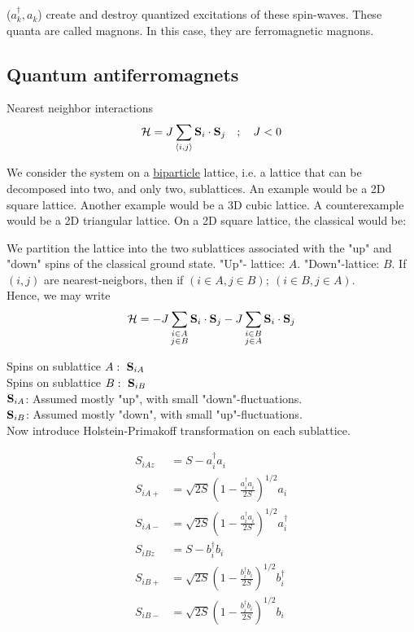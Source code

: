 
($a_k^\dagger, a_k^{}$) create and destroy quantized excitations of these spin-waves. These quanta are called magnons. In this case, they are ferromagnetic magnons.

\subsection{Quantum antiferromagnets}

Nearest neighbor interactions
\begin{equation}
	\mathcal{H} = J \sum_{\langle i, j \rangle}\vb{S}_i\cdot\vb{S}_j \quad ; \quad J < 0
\end{equation}

We consider the system on a \uline{biparticle} lattice, i.e. a lattice that can be decomposed into two, and only two, sublattices. An example would be a 2D square lattice. Another example would be a 3D cubic lattice. A counterexample would be a 2D triangular lattice. On a 2D square lattice, the classical would be:\\


We partition the lattice into the two sublattices associated with the "up" and "down" spins of the classical ground state. "Up"- lattice: $A$. "Down"-lattice: $B$. If $(i, j)$ are nearest-neigbors, then if $(i \in A, j \in B); \ (i \in B, j \in A)$. \\
Hence, we may write
\begin{equation}
	\mathcal{H} = - J \sum_{\substack{i \in A \\ j \in B}} \vb{S}_i \cdot \vb{S}_j - J \sum_{\substack{i \in B \\ j \in A}} \vb{S}_i \cdot \vb{S}_j
\end{equation}

Spins on sublattice $A: \ \vb{S}_{iA}$ \\
Spins on sublattice $B: \ \vb{S}_{iB}$ \\
$\vb{S}_{iA}$: Assumed mostly "up", with small "down"-fluctuations. \\
$\vb{S}_{iB}$: Assumed mostly "down", with small "up"-fluctuations. \\

Now introduce Holstein-Primakoff transformation on each sublattice.

\begin{align}
	S_{iAz} &= S - a_i^\dagger a_i^{} \\
	S_{iA+} &= \sqrt{2S} \left (1- \frac{a_i^\dagger a_i^{}}{2S}\right )^{1/2} a_i \\
	S_{iA-} &= \sqrt{2S} \left (1- \frac{a_i^\dagger a_i^{}}{2S}\right )^{1/2} a_i^\dagger \\
	S_{iBz} &= S - b_i^\dagger b_i^{} \\
	S_{iB+} &= \sqrt{2S} \left (1- \frac{b_i^\dagger b_i^{}}{2S}\right )^{1/2} b_i^\dagger \\
	S_{iB-} &= \sqrt{2S} \left (1- \frac{b_i^\dagger b_i^{}}{2S}\right )^{1/2} b_i \\
\end{align}

